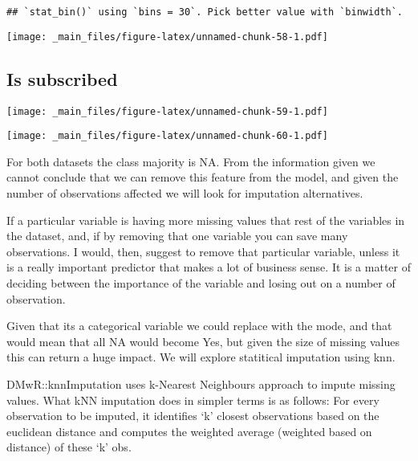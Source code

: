 \documentclass[
]{book}
\newenvironment{Shaded}{\begin{snugshade}}{\end{snugshade}}
\newcommand{\FunctionTok}[1]{\textcolor[rgb]{0.00,0.00,0.00}{#1}}
\newcommand{\NormalTok}[1]{#1}
\newcommand{\SpecialCharTok}[1]{\textcolor[rgb]{0.00,0.00,0.00}{#1}}
\begin{document}
\begin{verbatim}
## `stat_bin()` using `bins = 30`. Pick better value with `binwidth`.
\end{verbatim}

\texttt{[image: \_main\_files/figure-latex/unnamed-chunk-58-1.pdf]}

\hypertarget{is-subscribed}{%
\subsection{Is subscribed}\label{is-subscribed}}

\begin{Shaded}
\end{Shaded}

\texttt{[image: \_main\_files/figure-latex/unnamed-chunk-59-1.pdf]}

\begin{Shaded}
\end{Shaded}

\texttt{[image: \_main\_files/figure-latex/unnamed-chunk-60-1.pdf]}

For both datasets the class majority is NA. From the information given we cannot conclude that we can remove this feature from the model, and given the number of observations affected we will look for imputation alternatives.

If a particular variable is having more missing values that rest of the variables in the dataset, and, if by removing that one variable you can save many observations. I would, then, suggest to remove that particular variable, unless it is a really important predictor that makes a lot of business sense. It is a matter of deciding between the importance of the variable and losing out on a number of observation.

Given that its a categorical variable we could replace with the mode, and that would mean that all NA would become Yes, but given the size of missing values this can return a huge impact. We will explore statitical imputation using knn.

DMwR::knnImputation uses k-Nearest Neighbours approach to impute missing values. What kNN imputation does in simpler terms is as follows: For every observation to be imputed, it identifies `k' closest observations based on the euclidean distance and computes the weighted average (weighted based on distance) of these `k' obs.
\end{document}

